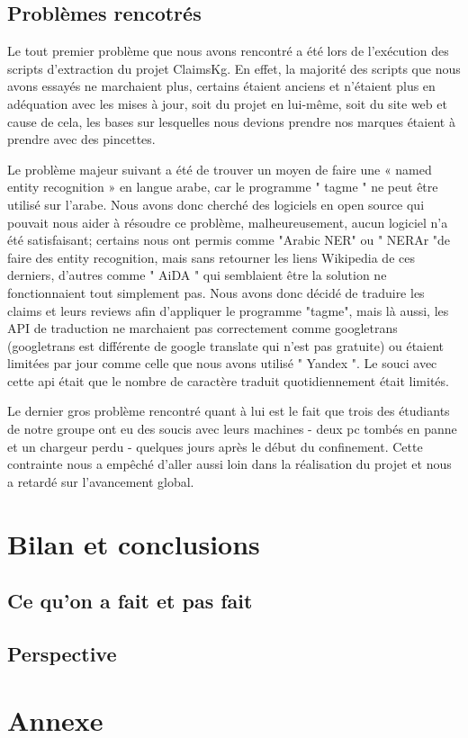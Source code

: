 \documentclass[oneside,13pt,a4paper]{report}
\begin{document}
\section{Problèmes rencotrés}
Le tout premier problème que nous avons rencontré a été lors de l'exécution des scripts d'extraction du projet ClaimsKg. En effet, la majorité des scripts que nous avons essayés ne marchaient plus, certains étaient anciens et n'étaient plus en adéquation avec les mises à jour, soit du projet en lui-même, soit du site web et cause de cela, les bases sur lesquelles nous devions prendre nos marques étaient à prendre avec des pincettes.

Le problème majeur suivant a été de trouver un moyen de faire une « named entity recognition » en langue arabe, car le programme " tagme " ne peut être utilisé sur l'arabe. Nous avons donc cherché des logiciels en open source qui pouvait nous aider à résoudre ce problème, malheureusement, aucun logiciel n'a été satisfaisant; certains nous ont permis comme "Arabic NER" ou " NERAr "de faire des entity recognition, mais sans retourner les liens Wikipedia de ces derniers, d'autres comme " AiDA " qui semblaient être la solution ne fonctionnaient tout simplement pas. Nous avons donc décidé de traduire les claims et leurs reviews afin d'appliquer le programme "tagme", mais là aussi, les API de traduction ne marchaient pas correctement comme googletrans (googletrans est différente de google translate qui n'est pas gratuite) ou étaient limitées par jour comme celle que nous avons utilisé " Yandex ". Le souci avec cette api était que le nombre de caractère traduit quotidiennement était limités.

Le dernier gros problème rencontré quant à lui est le fait que trois des étudiants de notre groupe ont eu des soucis avec leurs machines - deux pc tombés en panne et un chargeur perdu - quelques jours après le début du confinement. Cette contrainte nous a empêché d'aller aussi loin dans la réalisation du projet et nous a retardé sur l'avancement global.
\chapter{Bilan et conclusions}

\section{Ce qu'on a fait et pas fait}

\section{Perspective}



\appendix
\chapter{Annexe}
\end{document}
